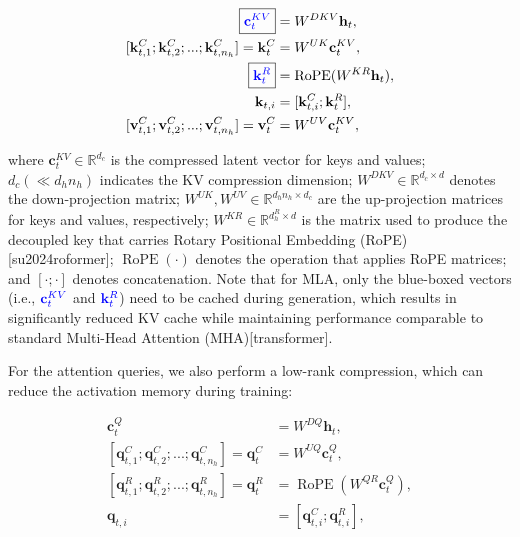 \documentclass[11pt,a4paper]{article}
\begin{document}
$$\begin{align}
    \boxed{\color{blue} \mathbf{c}_{t}^{KV}} &= W^{DKV} \mathbf{h}_{t}, \\
    [\mathbf{k}_{t, 1}^{C};\mathbf{k}_{t, 2}^{C};...;\mathbf{k}_{t, n_{h}}^{C}] = \mathbf{k}_{t}^{C} &= W^{UK} \mathbf{c}_{t}^{KV}, \\
    \boxed{\color{blue}\mathbf{k}_{t}^{R}} &= \operatorname{RoPE}({W^{KR}} \mathbf{h}_{t}), \\
    \mathbf{k}_{t, i} &= [\mathbf{k}_{t, i}^{C}; \mathbf{k}_{t}^{R}], \\
    [\mathbf{v}_{t, 1}^{C};\mathbf{v}_{t, 2}^{C};...;\mathbf{v}_{t, n_{h}}^{C}] = \mathbf{v}_{t}^{C} &= W^{UV} \mathbf{c}_{t}^{KV}, 
\end{align}$$

where $\mathbf{c}_{t}^{KV} \in \mathbb{R}^{d_c}$ is the compressed latent vector for keys and values; $d_c (\ll d_h n_h)$ indicates the KV compression dimension; $W^{DKV} \in \mathbb{R}^{d_c \times d}$ denotes the down-projection matrix; $W^{UK},W^{UV} \in \mathbb{R}^{d_h n_h \times d_c}$ are the up-projection matrices for keys and values, respectively; $W^{KR} \in \mathbb{R}^{d_h^R \times d}$ is the matrix used to produce the decoupled key that carries Rotary Positional Embedding (RoPE)[su2024roformer]; $\operatorname{RoPE}(\cdot)$ denotes the operation that applies RoPE matrices; and $[\cdot;\cdot]$ denotes concatenation. Note that for MLA, only the blue-boxed vectors (i.e., $\color{blue} \mathbf{c}_{t}^{KV}$ and $\color{blue}\mathbf{k}_{t}^{R}$) need to be cached during generation, which results in significantly reduced KV cache while maintaining performance comparable to standard Multi-Head Attention (MHA)[transformer].

For the attention queries, we also perform a low-rank compression, which can reduce the activation memory during training:

$$\begin{align}
    \mathbf{c}_{t}^{Q} &= W^{DQ} \mathbf{h}_{t}, \\
    [\mathbf{q}_{t, 1}^{C};\mathbf{q}_{t, 2}^{C};...;\mathbf{q}_{t, n_{h}}^{C}] = \mathbf{q}_{t}^{C} &= W^{UQ} \mathbf{c}_{t}^{Q}, \\
    [\mathbf{q}_{t, 1}^{R};\mathbf{q}_{t, 2}^{R};...;\mathbf{q}_{t, n_{h}}^{R}] = \mathbf{q}_{t}^{R} &= \operatorname{RoPE}({W^{QR}} \mathbf{c}_{t}^{Q}), \\
    \mathbf{q}_{t, i} &= [\mathbf{q}_{t, i}^{C}; \mathbf{q}_{t, i}^{R}],
\end{align}$$
\end{document}
